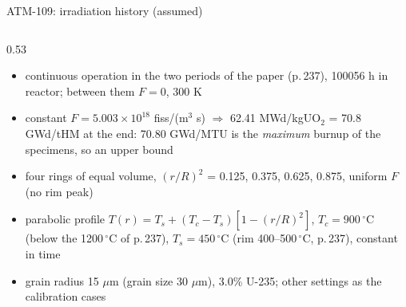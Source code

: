 \documentclass[aspectratio=169,10pt]{beamer}
\newcommand{\NEW}[1]{\textcolor{new}{#1}}
\begin{document}
\begin{frame}{ATM-109: irradiation history (assumed)}
  \centering
  \par\medskip
  \begin{columns}[T]
    \begin{column}{0.53\textwidth}
      \scriptsize
      \begin{itemize}
        \item \NEW{continuous operation in the two periods of the paper (p.\,237), 100056 h in reactor; between them $F = 0$, 300 K}
        \item \NEW{constant $F = 5.003\times10^{18}$ fiss/(m$^3$ s) $\Rightarrow$ 62.41 MWd/kgUO$_2$ = 70.8 GWd/tHM at the end:
          70.80 GWd/MTU is the \emph{maximum} burnup of the specimens, so an upper bound}
        \item \NEW{four rings of equal volume, $(r/R)^2$ = 0.125, 0.375, 0.625, 0.875, uniform $F$ (no rim peak)}
        \item \NEW{parabolic profile $T(r) = T_s + (T_c - T_s)[1 - (r/R)^2]$, $T_c = 900\,^\circ$C (below the 1200\,$^\circ$C of p.\,237),
          $T_s = 450\,^\circ$C (rim 400--500\,$^\circ$C, p.\,237), constant in time}
        \item grain radius 15 $\mu$m (grain size 30 $\mu$m), 3.0\% U-235; other settings as the calibration cases

\end{itemize}
\end{column}
\end{columns}
\end{frame}
\end{document}
